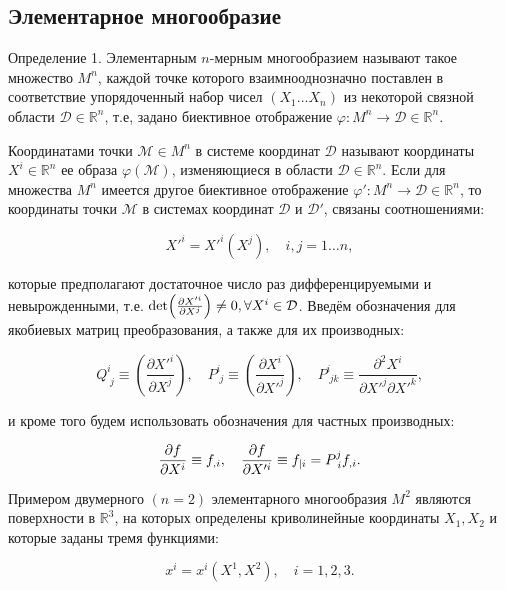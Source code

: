 \documentclass[14pt,a4paper]{extarticle}
\begin{document}
\subsection{Элементарное многообразие}
Определение 1. Элементарным $n$-мерным многообразием называют такое множество $M^n$, каждой точке которого
взаимнооднозначно поставлен в соответствие упорядоченный набор чисел $(X_1...X_n)$ из некоторой связной области $\mathcal{D} \in \mathbb{R}^n$, т.е, задано биективное отображение $\varphi: M^n \longrightarrow \mathcal{D} \in \mathbb{R}^n$.

Координатами точки $\mathcal{M} \in M^n$ в системе координат $\mathcal{D}$ называют координаты $X^i \in \mathbb{R}^n$ ее образа $\varphi(\mathcal{M})$, изменяющиеся в области $\mathcal{D} \in \mathbb{R}^n$.
Если для множества $M^n$ имеется другое биективное отображение $\varphi': M^n \longrightarrow \mathcal{D} \in \mathbb{R}^n$, то координаты точки $\mathcal{M}$ в системах координат $\mathcal{D}$ и $\mathcal{D'}$, связаны соотношениями:

\begin{equation}\label{e1}
	X'^i = X'^i(X^j), \quad i,j=1\dots n,
\end{equation}

которые предполагают достаточное число раз дифференцируемыми и невырожденными, т.е. $\det (\pdv{X'^i}{X^j}) \neq 0, \forall X^i \in \mathcal{D}$.
Введём обозначения для якобиевых матриц преобразования, а также для их производных:

\begin{equation}\label{eq2}
	Q_{\; j}^{i} \equiv\left(\frac{\partial X'^{i}}{\partial X^{j}}\right), \quad P_{\; j}^{i} \equiv\left(\frac{\partial X^{i}}{\partial X'^{j}}\right), \quad P_{\; j k}^{i} \equiv \frac{\partial^{2} X^{i}}{\partial X'^{j} \partial X'^{k}},
\end{equation}

и кроме того будем использовать обозначения для частных производных:

\begin{equation}\label{eq3}
	\pdv{f}{X^i} \equiv f_{,i}, \quad \pdv{f}{X'^i} \equiv f_{|i} = P_{\; i}^j f_{,i}.
\end{equation}

Примером двумерного $(n = 2)$ элементарного многообразия $M^2$ являются поверхности в $\mathbb{R}^3$, на которых определены криволинейные координаты $X_1, X_2$ и которые заданы тремя функциями:

\begin{equation}\label{eq4}
	x^i = x^{i}(X^1, X^2), \quad i=1,2,3.
\end{equation}
\end{document}
